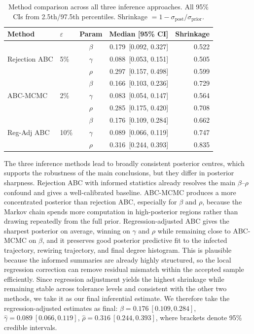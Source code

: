 \documentclass[12pt]{article}
\begin{document}
\begin{table}[h]
\centering
\small
\begin{tabular}{llcrr}
\toprule
\textbf{Method} & \textbf{$\varepsilon$} & \textbf{Param} & \textbf{Median [95\% CI]} & \textbf{Shrinkage} \\
\midrule
\multirow{3}{*}{Rejection ABC}
  & \multirow{3}{*}{5\%}
  & $\beta$  & 0.179\ [0.092, 0.327] & 0.522 \\
  & & $\gamma$ & 0.088\ [0.053, 0.151] & 0.505 \\
  & & $\rho$   & 0.297\ [0.157, 0.498] & 0.599 \\
\midrule
\multirow{3}{*}{ABC-MCMC}
  & \multirow{3}{*}{2\%}
  & $\beta$  & 0.166\ [0.103, 0.236] & 0.729 \\
  & & $\gamma$ & 0.083\ [0.054, 0.147] & 0.564 \\
  & & $\rho$   & 0.285\ [0.175, 0.420] & 0.708 \\
\midrule
\multirow{3}{*}{Reg-Adj ABC}
  & \multirow{3}{*}{10\%}
  & $\beta$  & 0.176\ [0.109, 0.284] & 0.662 \\
  & & $\gamma$ & 0.089\ [0.066, 0.119] & 0.747 \\
  & & $\rho$   & 0.316\ [0.244, 0.393] & 0.835 \\
\bottomrule
\end{tabular}
\caption{Method comparison across all three inference approaches. All 95\% CIs from 2.5th/97.5th percentiles. Shrinkage $= 1 - \sigma_{\mathrm{post}}/\sigma_{\mathrm{prior}}$.}
\label{tab:comparison}
\end{table}

The three inference methods lead to broadly consistent posterior centres, which supports the robustness of the main conclusions, but they differ in posterior sharpness. Rejection ABC with informed statistics already resolves the main $\beta$--$\rho$ confound and gives a well-calibrated baseline. ABC-MCMC produces a more concentrated posterior than rejection ABC, especially for $\beta$ and $\rho$, because the Markov chain spends more computation in high-posterior regions rather than drawing repeatedly from the full prior. Regression-adjusted ABC gives the sharpest posterior on average, winning on $\gamma$ and $\rho$ while remaining close to ABC-MCMC on $\beta$, and it preserves good posterior predictive fit to the infected trajectory, rewiring trajectory, and final degree histogram. This is plausible because the informed summaries are already highly structured, so the local regression correction can remove residual mismatch within the accepted sample efficiently. Since regression adjustment yields the highest shrinkage while remaining stable across tolerance levels and consistent with the other two methods, we take it as our final inferential estimate. We therefore take the regression-adjusted estimates as final: $\hat\beta = 0.176\ [0.109, 0.284]$, $\hat\gamma = 0.089\ [0.066, 0.119]$, $\hat\rho = 0.316\ [0.244, 0.393]$, where brackets denote 95\% credible intervals.
\end{document}
